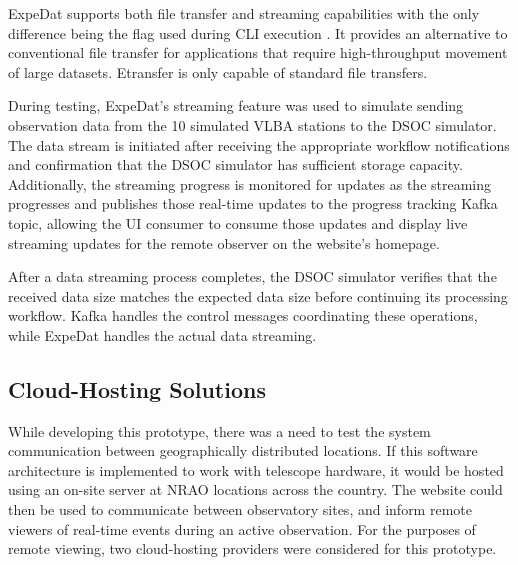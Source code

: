 \documentclass[12pt]{article}
\begin{document}
ExpeDat supports both file transfer and streaming capabilities with the only difference being the flag used during CLI execution \cite{data_expedition_inc_expedat_nodate}. It provides an alternative to conventional file transfer for applications that require high-throughput movement of large datasets. Etransfer is only capable of standard file transfers.

During testing, ExpeDat's streaming feature was used to simulate sending observation data from the 10 simulated VLBA stations to the DSOC simulator. The data stream is initiated after receiving the appropriate workflow notifications and confirmation that the DSOC simulator has sufficient storage capacity. Additionally, the streaming progress is monitored for updates as the streaming progresses and publishes those real-time updates to the progress tracking Kafka topic, allowing the UI consumer to consume those updates and display live streaming updates for the remote observer on the website's homepage.

After a data streaming process completes, the DSOC simulator verifies that the received data size matches the expected data size before continuing its processing workflow. Kafka handles the control messages coordinating these operations, while ExpeDat handles the actual data streaming.

\subsection*{Cloud-Hosting Solutions}

  While developing this prototype, there was a need to test the system communication between geographically distributed locations. If this software architecture is implemented to work with telescope hardware, it would be hosted using an on-site server at NRAO locations across the country. The website could then be used to communicate between observatory sites, and inform remote viewers of real-time events during an active observation. For the purposes of remote viewing, two cloud-hosting providers were considered for this prototype.
\end{document}
